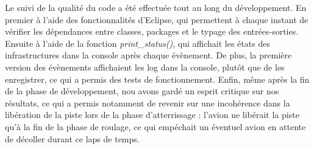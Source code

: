 Le suivi de la qualité du code a été effectuée tout au long du développement. En premier à l'aide des fonctionnalités d'Eclipse, qui permettent à chaque instant de vérifier les dépendances entre classes, packages et le typage des entrées-sorties. Ensuite à l'aide de la fonction \textit{print\_status()}, qui affichait les états des infrastructures dans la console après chaque évènement. De plus, la première version des évènements affichaient les log dans la console, plutôt que de les enregistrer, ce qui a permis des tests de fonctionnement.
Enfin, même après la fin de la phase de développement, nou avons gardé un esprit critique sur nos résultats, ce qui a permis notamment de revenir sur une incohérence dans la libération de la piste lors de la phase d'atterrissage : l'avion ne libérait la piste qu'à la fin de la phase de roulage, ce qui empéchait un éventuel avion en attente de décoller durant ce laps de temps.
